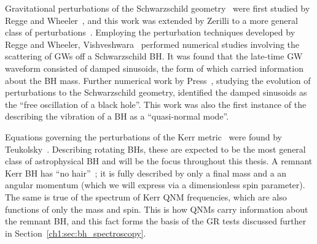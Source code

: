 Gravitational perturbations of the Schwarzschild geometry~\cite{Schwarzschild:1916uq} were first studied by Regge and Wheeler~\cite{Regge:1957td}, and this work was extended by Zerilli to a more general class of perturbations~\cite{Zerilli:1970se, Zerilli:1970wzz}.
Employing the perturbation techniques developed by Regge and Wheeler, Vishveshwara~\cite{Vishveshwara:1970zz} performed numerical studies involving the scattering of GWs off a Schwarzschild BH.
It was found that the late-time GW waveform consisted of damped sinusoids, the form of which carried information about the BH mass. 
Further numerical work by Press~\cite{Press:1971wr}, studying the evolution of perturbations to the Schwarzschild geometry, identified the damped sinusoids as the ``free oscillation of a black hole''.
This work was also the first instance of the describing the vibration of a BH as a ``quasi-normal mode''.

Equations governing the perturbations of the Kerr metric~\cite{Kerr:1963ud} were found by Teukolsky~\cite{Teukolsky:1972my}. 
Describing rotating BHs, these are expected to be the most general class of astrophysical BH and will be the focus throughout this thesis. 
A remnant Kerr BH has ``no hair''~\cite{Carter:1971zc}; it is fully described by only a final mass and a an angular momentum (which we will express via a dimensionless spin parameter). 
The same is true of the spectrum of Kerr QNM frequencies, which are also functions of only the mass and spin. 
This is how QNMs carry information about the remnant BH, and this fact forms the basis of the GR tests discussed further in Section~\ref{ch1:sec:bh_spectroscopy}.


